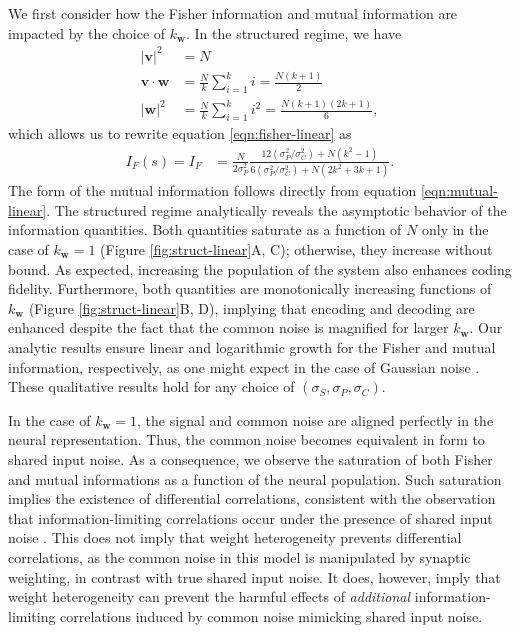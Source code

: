 \documentclass[12pt]{article}
\begin{document}
	We first consider how the Fisher information and mutual information are impacted by the choice of $k_{\mathbf{w}}$. In the structured regime, we have 
	\begin{align}
	|\mathbf{v}|^2 &= N \\
	\mathbf{v}\cdot\mathbf{w} &= \frac{N}{k} \sum_{i=1}^k i = \frac{N(k+1)}{2} \\
	|\mathbf{w}|^2 &= \frac{N}{k}\sum_{i=1}^k i^2 = \frac{N(k+1)(2k+1)}{6},
	\end{align}
	which allows us to rewrite equation \ref{eqn:fisher-linear} as
	\begin{align}
	I_F(s) = I_F &= \frac{N}{2\sigma_P^2} \frac{12 (\sigma_P^2/\sigma_C^2) + N  (k^2-1)}{6(\sigma_P^2/\sigma_C^2)+ N(2k^2+3k+1)}.
	\end{align}
	The form of the mutual information follows directly from equation \ref{eqn:mutual-linear}. The structured regime analytically reveals the asymptotic behavior of the information quantities. Both quantities saturate as a function of $N$  only in the case of $k_{\mathbf{w}}=1$ (Figure \ref{fig:struct-linear}A, C); otherwise, they increase without bound. As expected, increasing the population of the system also enhances coding fidelity. Furthermore, both quantities are monotonically increasing functions of $k_{\mathbf{w}}$ (Figure \ref{fig:struct-linear}B, D), implying that encoding and decoding are enhanced despite the fact that the common noise is magnified for larger $k_{\mathbf{w}}$. Our analytic results ensure linear and logarithmic growth for the Fisher and mutual information, respectively, as one might expect in the case of Gaussian noise \cite{Brunel1998}. These qualitative results hold for any choice of $(\sigma_S, \sigma_P, \sigma_C)$.
	
	In the case of $k_{\mathbf{w}}=1$, the signal and common noise are aligned perfectly in the neural representation. Thus, the common noise becomes equivalent in form to shared input noise. As a consequence, we observe the saturation of both Fisher and mutual informations as a function of the neural population. Such saturation implies the existence of differential correlations, consistent with the observation that information-limiting correlations occur under the presence of shared input noise \cite{Moreno-Bote2014}. This does not imply that weight heterogeneity prevents differential correlations, as the common noise in this model is manipulated by synaptic weighting, in contrast with true shared input noise. It does, however, imply that weight heterogeneity can prevent the harmful effects of \textit{additional} information-limiting correlations induced by common noise mimicking shared input noise.
	
\end{document}
